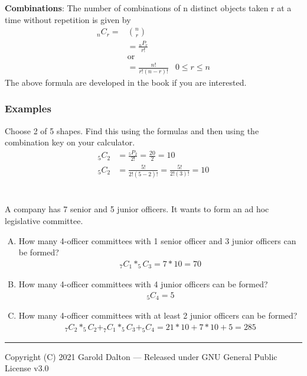 \documentclass[14pt]{extarticle}
\begin{document}
\begin{tcolorbox}[enhanced jigsaw,colback=bg,boxrule=0pt,arc=0pt] 
	\textbf{Combinations}:  The number of combinations of n distinct objects taken r at a time without repetition is given by
	\begin{align*}
		_nC_r =&n\choose r\\
		&= \frac{_nP_r}{r!}\\
		&\text{or} \\
		&= \frac{n!}{r!(n-r)!} &0 \leq r \leq n
	\end{align*}
The above formula are developed in the book if you are interested.
\end{tcolorbox}

\subsubsection{Examples}
Choose 2 of 5 shapes. Find this using the formulas and then using the combination key on your calculator.
\begin{align*}
	_{5}C_2 &= \frac{_5P_2}{2!} = \frac{20}{2} = 10 \\
	_{5}C_2 &= \frac{5!}{2!(5-2)!} = \frac{5!}{2!(3)!} = 10
\end{align*}
\\\\
A company has 7 senior and 5 junior officers. It wants to form an ad hoc legislative committee.
\begin{enumerate}[A)]
	\item How many 4-officer committees with 1 senior officer and 3 junior officers can be formed?
	\begin{align*}
		_{7}C_1 * _{5}C_3 = 7*10=70
	\end{align*}
	\item How many 4-officer committees with 4 junior officers can be formed?
	\begin{align*}
		_{5}C_4 = 5
	\end{align*}
	\item How many 4-officer committees with at least 2 junior officers can be formed?
	\begin{align*}
		_{7}C_2 * _{5}C_2 +_{7}C_1*_{5}C_3 + _{5}C_4 = 21*10+7*10+5=285
	\end{align*}
\end{enumerate}



\noindent\rule{\textwidth}{1pt}
{\footnotesize Copyright (C) 2021 Garold Dalton --- Released under GNU General Public License v3.0}


\cleardoublepage
\end{document}
